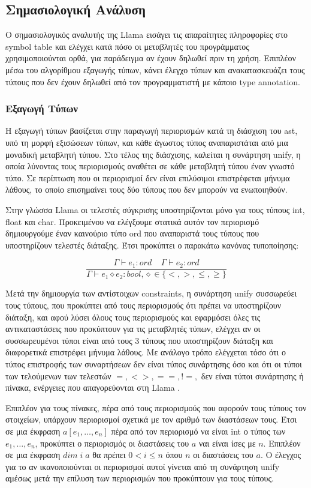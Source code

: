 \documentclass[12pt]{article}
\newcommand{\Llama}{\textsf{Llama }}
\begin{document}
\subsection{Σημασιολογική Ανάλυση}
Ο σημασιολογικός αναλυτής της \Llama εισάγει τις απαραίτητες πληροφορίες στο symbol table και ελέγχει κατά πόσο οι μεταβλητές του προγράμματος χρησιμοποιούνται ορθά, για παράδειγμα αν έχουν δηλωθεί πριν τη χρήση. Επιπλέον μέσω του αλγορίθμου εξαγωγής τύπων, κάνει έλεγχο τύπων και ανακατασκευάζει τους τύπους που δεν έχουν δηλωθεί από τον προγραμματιστή με κάποιο type annotation.


\subsubsection{Εξαγωγή Τύπων}
Η εξαγωγή τύπων βασίζεται στην παραγωγή περιορισμών κατά τη διάσχιση του ast, υπό τη μορφή εξισώσεων τύπων, και κάθε άγωστος τύπος αναπαριστάται από μια μοναδική μεταβλητή τύπου. Στο τέλος της διάσχισης, καλείται η συνάρτηση unify, η οποία λύνοντας τους περιορισμούς αναθέτει σε κάθε μεταβλητή τύπου έναν γνωστό τύπο. Σε περίπτωση που οι περιορισμοί δεν είναι επιλύσιμοι επιστρέφεται μήνυμα λάθους, το οποίο επισημαίνει τους δύο τύπους που δεν μπορούν να ενωποιηθούν.


Στην γλώσσα \Llama οι τελεστές σύγκρισης υποστηρίζονται μόνο για τους τύπους int, float και char. Προκειμένου να ελέγξουμε στατικά αυτόν τον περιορισμό δημιουργούμε έναν καινούριο τύπο ord που αναπαριστά τους τύπους που υποστηρίζουν τελεστές διάταξης. Έτσι προκύπτει ο παρακάτω κανόνας τυποποίησης:

$$\frac{\Gamma  \vdash e_1 : ord \;\;\;\; \Gamma  \vdash e_2 : ord  }{\Gamma  \vdash e_1 \diamond e_2 : bool,\diamond \in \lbrace <,>, \leq, \geq\rbrace}$$


Μετά την δημιουργία των αντίστοιχων constraints, η συνάρτηση unify συσσωρεύει τους τύπους, που προκύπτει από τους περιορισμούς ότι πρέπει να υποστηρίζουν διάταξη, και αφού λύσει όλους τους περιορισμούς και εφαρμόσει όλες τις αντικαταστάσεις που προκύπτουν για τις μεταβλητές τύπων, ελέγχει αν οι συσσωρευμένοι τύποι είναι από τους 3 τύπους που υποστηρίζουν διάταξη και διαφορετικά επιστρέφει μήνυμα λάθους. Με ανάλογο τρόπο ελέγχεται τόσο ότι ο τύπος επιστροφής των συναρτήσεων δεν είναι τύπος συνάρτησης όσο και ότι οι τύποι των τελούμενων των τελεστών $=,<>,==,!=,$ δεν είναι τύποι συνάρτησης ή πίνακα, ενέργειες που απαγορεύονται στη \Llama. 

Επιπλέον για τους πίνακες, πέρα από τους περιορισμούς που αφορούν τους τύπους τον στοιχείων, υπάρχουν περιορισμοί σχετικά με τον αριθμό των διαστάσεων τους. Έτσι σε μια έκφραση $a[e_1, \ldots, e_n]$ πέρα από τον περιορισμό να είναι int ο τύπος των $e_1, \ldots, e_n$, προκύπτει ο περιορισμός οι διαστάσεις του $a$ ναι είναι ίσες με $n$. Επιπλέον σε μια έκφραση $dim \; i \; a$ θα πρέπει $0 < i \leq n$ όπου $n$ οι διαστάσεις του $a$. Ο έλεγχος για το αν ικανοποιούνται οι περιορισμοί αυτοί γίνεται από τη συνάρτηση unify αμέσως μετά την επίλυση των περιορισμών που προκύπτουν για τους τύπους.
\end{document}
